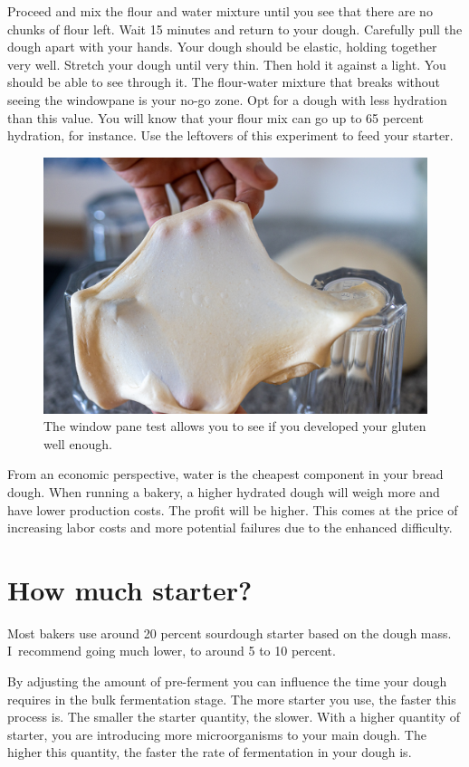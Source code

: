 Proceed and mix the flour and water mixture until you see that there
are no chunks of flour left. Wait 15 minutes and return to your dough.
Carefully pull the dough apart with your hands. Your dough should be elastic, holding
together very well. Stretch your dough until very thin. Then hold it against a light.
You should be able to see through it. The flour-water mixture that breaks without
seeing the windowpane is your no-go zone. Opt for a dough with
less hydration than this value. You will know that your flour mix can go up to
65 percent hydration, for instance. Use the leftovers of this experiment
to feed your starter.


\begin{figure}[!htb]
  \includegraphics[width=\textwidth]{window-pane-effect}
  \caption{The window pane test allows you to see if you developed your gluten
  well enough.}
\end{figure}


From an economic perspective, water is the cheapest component in your bread
dough. When running a bakery, a higher hydrated dough will weigh more and have
lower production costs. The profit will be higher. This comes at the price
of increasing labor costs and more potential failures due to the enhanced
difficulty.

\section{How much starter?}

Most bakers use around 20 percent sourdough starter based on the dough mass.
I~recommend going much lower, to around 5 to 10 percent.

By adjusting the amount of pre-ferment you can influence the time your dough
requires in the bulk fermentation stage. The more starter you use, the faster
this process is. The smaller the starter quantity, the slower. With a higher
quantity of starter, you are introducing more microorganisms to your main
dough. The higher this quantity, the faster the rate of fermentation in your
dough is.

